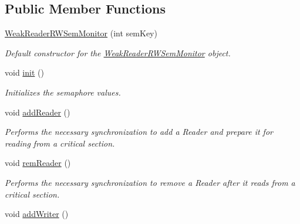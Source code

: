 \subsection*{Public Member Functions}
\begin{DoxyCompactItemize}
\item 
\hyperlink{classWeakReaderRWSemMonitor_a554a407ac7823920356998a614f08cda}{Weak\-Reader\-R\-W\-Sem\-Monitor} (int sem\-Key)
\begin{DoxyCompactList}\small\item\em Default constructor for the \hyperlink{classWeakReaderRWSemMonitor}{Weak\-Reader\-R\-W\-Sem\-Monitor} object. \end{DoxyCompactList}\item 
\hypertarget{classWeakReaderRWSemMonitor_aaee0875e0d672442f05382c3704cec6d}{void \hyperlink{classWeakReaderRWSemMonitor_aaee0875e0d672442f05382c3704cec6d}{init} ()}\label{classWeakReaderRWSemMonitor_aaee0875e0d672442f05382c3704cec6d}

\begin{DoxyCompactList}\small\item\em Initializes the semaphore values. \end{DoxyCompactList}\item 
\hypertarget{classWeakReaderRWSemMonitor_a2ac7607aa835603c765c2b356689b29e}{void \hyperlink{classWeakReaderRWSemMonitor_a2ac7607aa835603c765c2b356689b29e}{add\-Reader} ()}\label{classWeakReaderRWSemMonitor_a2ac7607aa835603c765c2b356689b29e}

\begin{DoxyCompactList}\small\item\em Performs the necessary synchronization to add a Reader and prepare it for reading from a critical section. \end{DoxyCompactList}\item 
\hypertarget{classWeakReaderRWSemMonitor_a09b5b8c7f9b73b52fc8c42b6b28e0e28}{void \hyperlink{classWeakReaderRWSemMonitor_a09b5b8c7f9b73b52fc8c42b6b28e0e28}{rem\-Reader} ()}\label{classWeakReaderRWSemMonitor_a09b5b8c7f9b73b52fc8c42b6b28e0e28}

\begin{DoxyCompactList}\small\item\em Performs the necessary synchronization to remove a Reader after it reads from a critical section. \end{DoxyCompactList}\item 
\hypertarget{classWeakReaderRWSemMonitor_a27a5078c24fbf42e2ac65e8d99ed7897}{void \hyperlink{classWeakReaderRWSemMonitor_a27a5078c24fbf42e2ac65e8d99ed7897}{add\-Writer} ()}\label{classWeakReaderRWSemMonitor_a27a5078c24fbf42e2ac65e8d99ed7897}


\end{DoxyCompactItemize}
